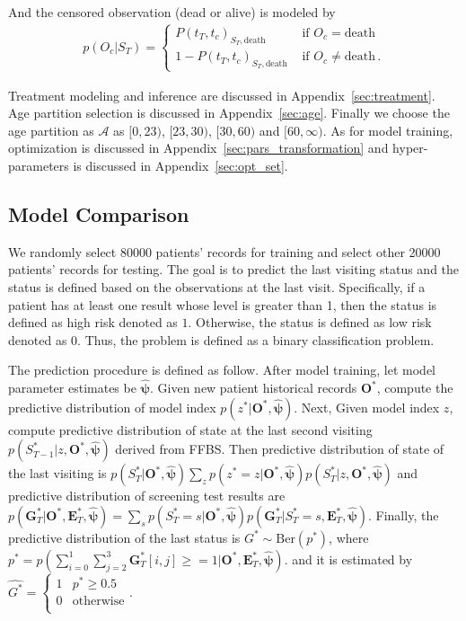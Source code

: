 \documentclass{article}
\begin{document}
And the censored observation (dead or alive) is modeled by
\begin{eqnarray*}
	p(O_{c}|S_T) = \begin{cases}
		P(t_T, t_{c})_{S_T, \text{death}} & \text{ if } O_{c} = \mathrm{death}\\
		1-P(t_T, t_{c})_{S_T, \text{death}} &   \text{ if }  O_{c} \neq \mathrm{death}\,.
	\end{cases}
\end{eqnarray*}

Treatment modeling and inference are discussed in Appendix~\ref{sec:treatment}. Age partition selection is discussed in Appendix~\ref{sec:age}. Finally we choose the age partition as $\mathcal{A}$ as $[0, 23)$, $[23,30)$, $[30,60)$ and $[60, \infty)$. As for model training, optimization is discussed in Appendix~\ref{sec:pars_transformation}
 and hyper-parameters is discussed in Appendix~\ref{sec:opt_set}.

\subsection{Model Comparison}
We randomly select 80000 patients' records for training and select other 20000 patients' records for testing. The goal is to predict the last visiting status and the status is defined based on the observations at the last visit. Specifically, if a patient has at least one result whose level is greater than 1, then the status is defined as high risk denoted as $1$. Otherwise, the status is defined as low risk denoted as $0$. Thus, the problem is defined as a binary classification problem. 

The prediction procedure is defined as follow. After model training, let model parameter estimates be $\hat{\bm \psi}$. Given new patient historical records $\bm O^*$, compute the predictive distribution of model index $p(z^*|\bm O^*, \hat{\bm \psi})$. Next, Given model index $z$, compute predictive distribution of state at the last second visiting 
$p(S^*_{T-1}|z, \bm O^*, \hat{\bm \psi})$ derived from FFBS. Then predictive distribution of state of the last visiting is 
$p(S^*_{T}|\bm O^*, \hat{\bm \psi}) \sum_{z} p(z^* = z|\bm O^*, \hat{\bm \psi}) p(S^*_{T}|z, \bm O^*, \hat{\bm \psi})$ and predictive distribution of screening test results are $p(\bm G^*_{T}| \bm O^*, \bm E^*_T, \hat{\bm \psi}) = \sum_s p(S^*_{T} = s|\bm O^*, \hat{\bm \psi}) p(\bm G^*_{T}| S_{T}^* = s, \bm E_{T}^*, \hat{\bm \psi})$. Finally, the predictive distribution of the last status is $G^* \sim \mathrm{Ber}\left( p^* \right)$, where $p^* = p\left(\sum_{i = 0}^{1}\sum_{j = 2}^3 \bm G_{T}^*[i,j] \geq = 1 |  \bm O^*, \bm E^*_T, \hat{\bm \psi}\right)$. and it is estimated by $\hat{G^*} = \begin{cases}
1 & p^* \geq 0.5 \\
0 & \mathrm{otherwise} \\
\end{cases}$.
\end{document}
